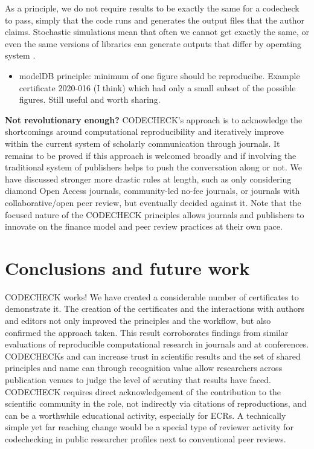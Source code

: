\documentclass[12pt]{article}
\begin{document}
As a principle, we do not require results to be exactly the same for a
codecheck to pass, simply that the code runs and generates the output
files that the author claims. Stochastic simulations mean that often
we cannot get exactly the same, or even the same versions of libraries
can generate outputs that differ by operating system
\cite{Gronenschild2012-pp}.

\begin{itemize}
\item modelDB principle: minimum of one figure should be reproducibe.
  Example certificate 2020-016 (I think) which had only a small subset
  of the possible figures. Still useful and worth sharing.
\end{itemize}

\textbf{Not revolutionary enough?}
CODECHECK's approach is to acknowledge the shortcomings around 
computational reproducibility and iteratively improve within the current
system of scholarly communication through journals.
It remains to be proved if this approach is welcomed broadly and if 
involving the traditional system of publishers helps to push the 
conversation along or not.
We have discussed stronger more drastic rules at length, such as only 
considering diamond Open Access journals, community-led no-fee journals,
or journals with collaborative/open peer review, but eventually decided
against it.
Note that the focused nature of the CODECHECK principles allows journals
and publishers to innovate on the finance model and peer review practices
at their own pace.

\section*{Conclusions and future work}\label{future-work-and-conclusions}

CODECHECK works!
We have created a considerable number of certificates to demonstrate it.
The creation of the certificates and the interactions with authors and
editors not only improved the principles and the workflow, but also
confirmed the approach taken. This result corroborates findings from
similar evaluations of reproducible computational research in journals and
at conferences.
CODECHECKs and can increase trust in scientific results and the set of 
shared principles and name can through recognition value allow researchers
across publication venues to judge the level of scrutiny that results have
faced. CODECHECK requires direct acknowledgement of the contribution to the
scientific community in the role, not indirectly via citations of 
reproductions, and can be a worthwhile educational activity, especially for
ECRs. A technically simple yet far reaching change would be a special type of 
reviewer activity for codechecking in public researcher profiles next to
conventional peer reviews.
\end{document}
